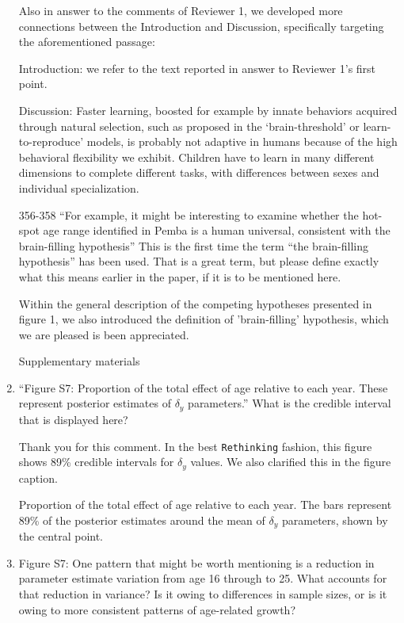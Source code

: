 \documentclass{article}
\newcommand{\rev}[1]{{\color{Red}#1}}
\newcommand{\comment}[1]{{\color{Blue}#1}}
\begin{document}
\begin{enumerate}
    \comment{Also in answer to the comments of Reviewer 1, we developed more connections between the Introduction and Discussion, specifically targeting the aforementioned passage:}
    
    Introduction: we refer to the text reported in answer to Reviewer 1's first point.
    
    Discussion: \rev{Faster learning, boosted for example by innate behaviors acquired through natural selection, such as proposed in the `brain-threshold' or learn-to-reproduce' models, is probably not adaptive in humans because of the high behavioral flexibility we exhibit. Children have to learn in many different dimensions to complete different tasks, with differences between sexes and individual specialization.}

    356-358 “For example, it might be interesting to examine whether the hot-spot age range identified in Pemba is a human universal, consistent with the brain-filling hypothesis” This is the first time the term “the brain-filling hypothesis” has been used. That is a great term, but please define exactly what this means earlier in the paper, if it is to be mentioned here.
    
    \comment{Within the general description of the competing hypotheses presented in figure 1, we also introduced the definition of 'brain-filling' hypothesis, which we are pleased is been appreciated.}

Supplementary materials

    \item “Figure S7: Proportion of the total effect of age relative to each year. These represent posterior estimates of $\delta_y$ parameters.” What is the credible interval that is displayed here?
    
    \comment{Thank you for this comment. In the best \texttt{Rethinking} fashion, this figure shows 89\% credible intervals for $\delta_y$ values. We also clarified this in the figure caption.}
    
\rev{Proportion of the total effect of age relative to each year. The bars represent 89\% of the posterior estimates around the mean of $\delta_y$ parameters, shown by the central point.}

    \item \label{itm:delta_y} Figure S7: One pattern that might be worth mentioning is a reduction in parameter estimate variation from age 16 through to 25. What accounts for that reduction in variance? Is it owing to differences in sample sizes, or is it owing to more consistent patterns of age-related growth?


\end{enumerate}
\end{document}
